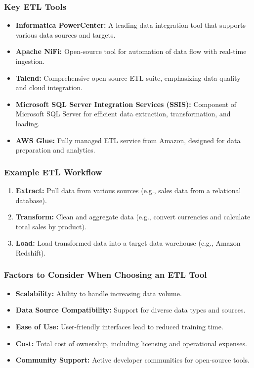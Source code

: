 \documentclass[aspectratio=169]{beamer}
\begin{document}
\begin{frame}[fragile]
    \frametitle{Key ETL Tools}
    \begin{itemize}
        \item \textbf{Informatica PowerCenter:} A leading data integration tool that supports various data sources and targets.
        \item \textbf{Apache NiFi:} Open-source tool for automation of data flow with real-time ingestion.
        \item \textbf{Talend:} Comprehensive open-source ETL suite, emphasizing data quality and cloud integration.
        \item \textbf{Microsoft SQL Server Integration Services (SSIS):} Component of Microsoft SQL Server for efficient data extraction, transformation, and loading.
        \item \textbf{AWS Glue:} Fully managed ETL service from Amazon, designed for data preparation and analytics.
    \end{itemize}
\end{frame}

\begin{frame}[fragile]
    \frametitle{Example ETL Workflow}
    \begin{enumerate}
        \item \textbf{Extract:} Pull data from various sources (e.g., sales data from a relational database).
        \item \textbf{Transform:} Clean and aggregate data (e.g., convert currencies and calculate total sales by product).
        \item \textbf{Load:} Load transformed data into a target data warehouse (e.g., Amazon Redshift).
    \end{enumerate}
\end{frame}

\begin{frame}[fragile]
    \frametitle{Factors to Consider When Choosing an ETL Tool}
    \begin{itemize}
        \item \textbf{Scalability:} Ability to handle increasing data volume.
        \item \textbf{Data Source Compatibility:} Support for diverse data types and sources.
        \item \textbf{Ease of Use:} User-friendly interfaces lead to reduced training time.
        \item \textbf{Cost:} Total cost of ownership, including licensing and operational expenses.
        \item \textbf{Community Support:} Active developer communities for open-source tools.
    \end{itemize}
\end{frame}
\end{document}
